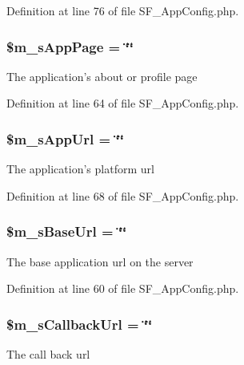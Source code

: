 Definition at line 76 of file SF\_\-AppConfig.php.

\hypertarget{classSF__AppConfig_ae9ca918bbe92c641557f1ee16a082100}{
\subsubsection[{\$m\_\-sAppPage}]{\setlength{\rightskip}{0pt plus 5cm}\$m\_\-sAppPage = \char`\"{}\char`\"{}}}
\label{classSF__AppConfig_ae9ca918bbe92c641557f1ee16a082100}
The application's about or profile page 

Definition at line 64 of file SF\_\-AppConfig.php.

\hypertarget{classSF__AppConfig_ab35950231d123d9279d8b0b3b0878609}{
\subsubsection[{\$m\_\-sAppUrl}]{\setlength{\rightskip}{0pt plus 5cm}\$m\_\-sAppUrl = \char`\"{}\char`\"{}}}
\label{classSF__AppConfig_ab35950231d123d9279d8b0b3b0878609}
The application's platform url 

Definition at line 68 of file SF\_\-AppConfig.php.

\hypertarget{classSF__AppConfig_a12f1f6a87e26bffa94c2b7e5ea3885c9}{
\subsubsection[{\$m\_\-sBaseUrl}]{\setlength{\rightskip}{0pt plus 5cm}\$m\_\-sBaseUrl = \char`\"{}\char`\"{}}}
\label{classSF__AppConfig_a12f1f6a87e26bffa94c2b7e5ea3885c9}
The base application url on the server 

Definition at line 60 of file SF\_\-AppConfig.php.

\hypertarget{classSF__AppConfig_a5c010b1e93c651cf5024339d568fb0d1}{
\subsubsection[{\$m\_\-sCallbackUrl}]{\setlength{\rightskip}{0pt plus 5cm}\$m\_\-sCallbackUrl = \char`\"{}\char`\"{}}}
\label{classSF__AppConfig_a5c010b1e93c651cf5024339d568fb0d1}
The call back url 

